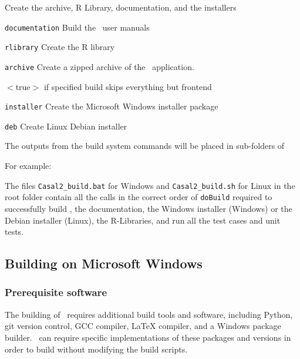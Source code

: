 Create the archive, R Library, documentation, and the installers
\begin{description}
  \item{\texttt{documentation}} Build the \CNAME\ user manuals
  \item{\texttt{rlibrary}} Create the R library
  \item{\texttt{archive}} Create a zipped archive of the \CNAME\ application.
  \begin{description}
     \item{$<$true$>$} if specified build skips everything but frontend
  \end{description}
  \item{\texttt{installer}} Create the Microsoft Windows installer package
  \item{\texttt{deb}} Create Linux Debian installer
\end{description}

The outputs from the build system commands will be placed in sub-folders of 

For example:





 The files \texttt{Casal2\_build.bat} for Windows and \texttt{Casal2\_build.sh} for Linux in the root folder contain all the calls in the correct order of \texttt{doBuild} required to successfully build \CNAME, the documentation, the Windows installer (Windows) or the Debian installer (Linux), the R-Libraries, and run all the test cases and unit tests.

\subsection{Building on Microsoft Windows}

\subsubsection{Prerequisite software}

The building of \CNAME\ requires additional build tools and software, including Python, git version control, GCC compiler, LaTeX compiler, and a Windows package builder. \CNAME\ can require specific implementations of these packages and versions in order to build without modifying the build scripts.

